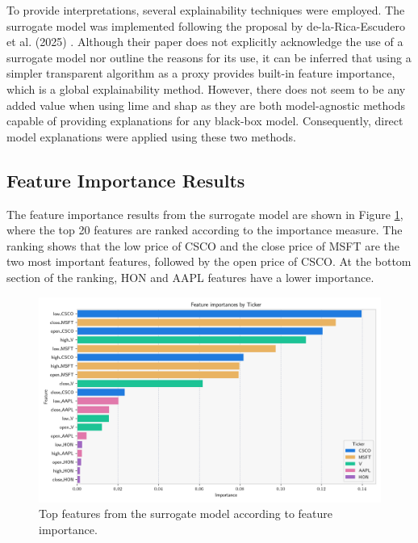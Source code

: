 To provide interpretations, several explainability techniques were employed. The surrogate model was implemented following the proposal by de-la-Rica-Escudero et al. (2025) \cite{de-La-Rica-Escudero2025}. Although their paper does not explicitly acknowledge the use of a surrogate model nor outline the reasons for its use, it can be inferred that using a simpler transparent algorithm as a proxy provides built-in feature importance, which is a global explainability method. However, there does not seem to be any added value when using \acrshort{lime} and \acrshort{shap} as they are both model-agnostic methods capable of providing explanations for any black-box model. Consequently, direct model explanations were applied using these two methods.

\subsection{Feature Importance Results} \label{sec:feature-importance-results}

The feature importance results from the surrogate model are shown in Figure \ref{fig:feature_importance_top_features}, where the top 20 features are ranked according to the importance measure. The ranking shows that the low price of CSCO and the close price of MSFT are the two most important features, followed by the open price of CSCO. At the bottom section of the ranking, HON and AAPL features have a lower importance.

\begin{figure}
    \centering
    \includegraphics[width=\textwidth]{figures/feature_importance_top_features.png}
    \caption{Top features from the surrogate model according to feature importance.}
    \label{fig:feature_importance_top_features}
\end{figure}


